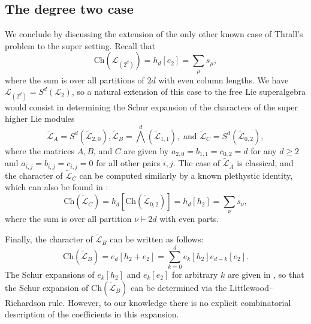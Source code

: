 \documentclass[11pt]{article}
\theoremstyle{definition}
\numberwithin{equation}{section}
\newcommand\Lcal{\mathcal{L}}
\newcommand\Ltil{\widetilde{\mathcal{L}}}
\newcommand\Ch{\mathrm{Ch}}
\begin{document}
\subsection{The degree two case}

We conclude by discussing the extension of the only other known case of Thrall's problem to the super setting. Recall that
\[
\Ch(\Lcal_{(2^d)}) = h_d[e_2] = \sum_\mu s_\mu,
\]
where the sum is over all partitions of $2d$ with even column lengths. We have $\Lcal_{(2^d)} = S^d(\Lcal_2)$, so a natural extension of this case to the free Lie superalgebra would consist in determining the Schur expansion of the characters of the super higher Lie modules
\[
\Ltil_A = S^d(\Ltil_{2,0}), \Ltil_B = \bigwedge^d(\Ltil_{1,1}), \text{ and } \Ltil_C = S^d(\Ltil_{0,2}),
\]
where the matrices $A,B$, and $C$ are given by $a_{2,0} = b_{1,1} = c_{0,2} = d$ for any $d \ge 2$ and $a_{i,j} = b_{i,j} = c_{i,j} = 0$ for all other pairs $i,j$. The case of $\Ltil_A$ is classical, and the character of $\Ltil_C$ can be computed similarly by a known plethystic identity, which can also be found in \cite[Ex.~I.8.6(a)]{Mac}:
\[
\Ch(\Ltil_C) = h_d[\Ch(\Ltil_{0,2})] = h_d[h_2] = \sum_{\nu} s_\nu,
\]
where the sum is over all partition $\nu \vdash 2d$ with even parts.

Finally, the character of $\Ltil_B$ can be written as follows:
\[
\Ch(\Ltil_B) = e_d[h_2+e_2] = \sum_{k = 0}^d e_k[h_2]e_{d-k}[e_2].
\]
The Schur expansions of $e_k[h_2]$ and $e_k[e_2]$ for arbitrary $k$ are given in \cite[Ex.~I.8.6(c,d)]{Mac}, so that the Schur expansion of $\Ch(\Ltil_B)$ can be determined via the Littlewood--Richardson rule. However, to our knowledge there is no explicit combinatorial description of the coefficients in this expansion.
\end{document}
